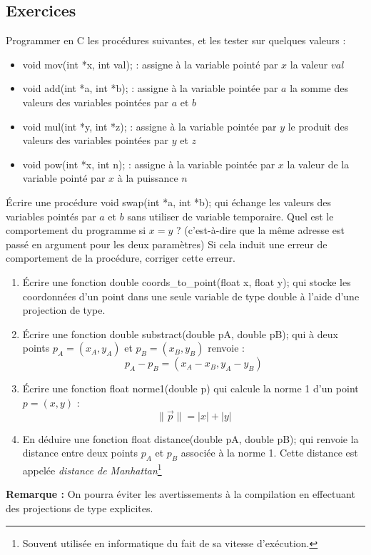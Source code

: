 \documentclass[../../../main.tex]{subfiles}
\begin{document}
\subsection{Exercices}
 Programmer en C les procédures suivantes, et les tester sur quelques valeurs :
\begin{itemize}
	\item \textsf{void mov(int *x, int val);} : assigne à la variable pointé par $x$ la valeur $val$
	\item \textsf{void add(int *a, int *b);} : assigne à la variable pointée par $a$ la somme des valeurs des variables pointées par $a$ et $b$
	\item \textsf{void mul(int *y, int *z);} : assigne à la variable pointée par $y$ le produit des valeurs des variables pointées par $y$ et $z$
	\item \textsf{void pow(int *x, int n);} : assigne à la variable pointée par $x$ la valeur de la variable pointé par $x$ à la puissance $n$
\end{itemize}
 Écrire une procédure \textsf{void swap(int *a, int *b);} qui échange les valeurs des variables pointés par $a$ et $b$ sans utiliser de variable temporaire. Quel est le comportement du programme si $x = y$ ? (c'est-à-dire que la même adresse est passé en argument pour les deux paramètres) \newline
Si cela induit une erreur de comportement de la procédure, corriger cette erreur.
 
\begin{enumerate}
	\item Écrire une fonction \textsf{double coords\_to\_point(float x, float y);} qui stocke les coordonnées d'un point dans une seule variable de type \textsf{double} à l'aide d'une projection de type.
	\item Écrire une fonction \textsf{double substract(double pA, double pB);} qui à deux points $p_{A} = (x_{A}, y_{A})$ et $p_{B} = (x_{B}, y_{B})$ renvoie : $$p_{A} - p_{B} = (x_{A} - x_{B}, y_{A} - y_{B})$$
	\item Écrire une fonction \textsf{float norme1(double p)} qui calcule la norme 1 d'un point $p = (x, y)$ :
	$$\lVert{\vec{p}}\rVert = |x| + |y|$$
	\item En déduire une fonction \textsf{float distance(double pA, double pB);} qui renvoie la distance entre deux points $p_{A}$ et $p_{B}$ associée à la norme 1. Cette distance est appelée \textit{distance de Manhattan}\footnote{Souvent utilisée en informatique du fait de sa vitesse d'exécution.}
\end{enumerate}
\textbf{Remarque : }On pourra éviter les avertissements à la compilation en effectuant des projections de type explicites.
\end{document}
